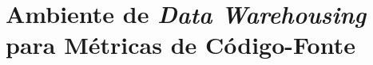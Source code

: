 \chapter{Ambiente de \textit{Data Warehousing} para Métricas de Código-Fonte}
\label{chap:arquitetura}
